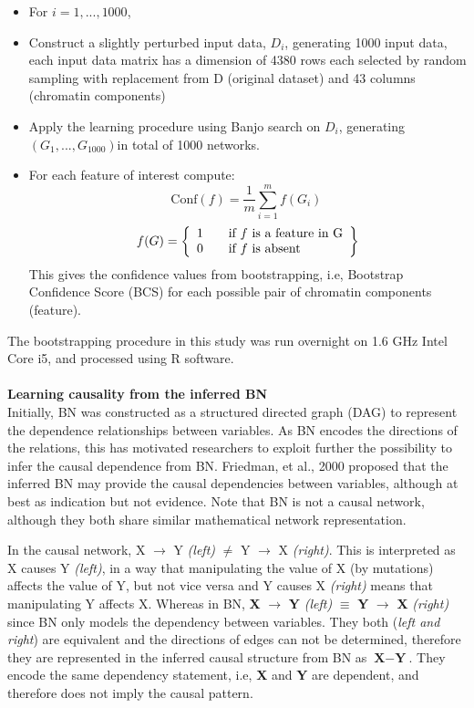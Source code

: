 \documentclass{bioinfo}
\begin{document}
\begin{methods}
\begin{itemize}
\item For \(i = 1, ... , 1000\),
\item Construct a slightly perturbed input data, \(D_i\), generating 1000 input data, each input data matrix has a dimension of 4380 rows each selected by random sampling with replacement from D (original dataset) and 43 columns (chromatin components)
\item Apply the learning procedure using Banjo search on \( D_i \), generating \((G_1, ..., G_{1000})\)in total of 1000 networks.
\item For each feature of interest compute:
\[
\text{Conf}(f)= \frac{1}{m} \sum_{i=1}^{m} f(G_i)\
\]
\[
  f(G) = \left\{ 
  \begin{array}{l l}
    1 & \quad \text{if $f$ is a feature in G}\\
    0 & \quad \text{if $f$ is absent}\\
  \end{array} \right\}
\]
This gives the confidence values from bootstrapping, i.e, Bootstrap Confidence Score (BCS) for each possible pair of chromatin components (feature). 

\end{itemize}

The bootstrapping procedure in this study was run overnight on 1.6 GHz Intel Core i5, and processed using R software.\\
\\
\textbf{Learning causality from the inferred BN}\\
Initially, BN was constructed as a structured directed graph (DAG) to represent the dependence relationships between variables.  As BN encodes the directions of the relations, this has motivated researchers to exploit further the possibility to infer the causal dependence from BN. Friedman, et al., 2000 proposed that the inferred BN may provide the causal dependencies between variables, although at best as indication but not evidence. Note that BN is not a causal network, although they both share similar mathematical network representation.

In the causal network, X \(\rightarrow\) Y \textit{(left)} \(\neq\) Y \(\rightarrow\) X \textit{(right)}. This is interpreted as X causes Y \textit{(left)}, in a way that manipulating the value of X (by mutations) affects the value of Y, but not vice versa and Y causes X \textit{(right)} means that manipulating Y affects X.  Whereas in BN, \textbf{X} \(\rightarrow\) \textbf{Y} \textit{(left)} \(\equiv\) \textbf{Y} \(\rightarrow\) \textbf{X} \textit{(right)} since BN only models the dependency between variables. They both (\textit{left and right}) are equivalent and the directions of edges can not be determined, therefore they are represented in the inferred causal structure from BN as \(\textbf{X}-\textbf{Y}\). They encode the same dependency statement, i.e, \textbf{X} and \textbf{Y} are dependent, and therefore does not imply the causal pattern. 


\end{methods}
\end{document}
